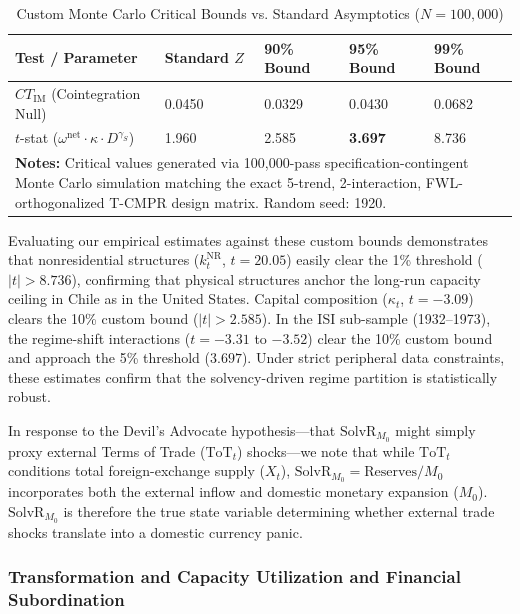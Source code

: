\begin{table}[h!]
	\centering
	\caption{Custom Monte Carlo Critical Bounds vs. Standard Asymptotics ($N = 100,000$)}
	\label{tab:chile_mc_bounds}
	\begin{tabular}{p{4.5cm} p{2.2cm} p{2.2cm} p{2.2cm} p{2.2cm}}
		\toprule
		\textbf{Test / Parameter} & \textbf{Standard $Z$} & \textbf{90\% Bound} & \textbf{95\% Bound} & \textbf{99\% Bound} \\
		\midrule
		$CT_{\text{IM}}$ (Cointegration Null) & 0.0450 & 0.0329 & 0.0430 & 0.0682 \\
		$t$-stat ($\omega^{\text{net}} \cdot \kappa \cdot D^{\gamma_S}$) & 1.960 & 2.585 & \textbf{3.697} & 8.736 \\
		\bottomrule
		\multicolumn{5}{p{13.3cm}}{\footnotesize \textbf{Notes:} Critical values generated via 100,000-pass specification-contingent Monte Carlo simulation matching the exact 5-trend, 2-interaction, FWL-orthogonalized T-CMPR design matrix. Random seed: 1920.}
	\end{tabular}
\end{table}

Evaluating our empirical estimates against these custom bounds demonstrates that nonresidential structures ($k^{\text{NR}}_t$, $t = 20.05$) easily clear the 1\% threshold ($|t| > 8.736$), confirming that physical structures anchor the long-run capacity ceiling in Chile as in the United States. Capital composition ($\kappa_t$, $t = -3.09$) clears the 10\% custom bound ($|t| > 2.585$). In the ISI sub-sample (1932--1973), the regime-shift interactions ($t = -3.31$ to $-3.52$) clear the 10\% custom bound and approach the 5\% threshold ($3.697$). Under strict peripheral data constraints, these estimates confirm that the solvency-driven regime partition is statistically robust.

In response to the Devil's Advocate hypothesis---that $\text{SolvR}_{M_0}$ might simply proxy external Terms of Trade ($\text{ToT}_t$) shocks---we note that while $\text{ToT}_t$ conditions total foreign-exchange supply ($X_t$), $\text{SolvR}_{M_0} = \text{Reserves}/M_0$ incorporates both the external inflow and domestic monetary expansion ($M_0$). $\text{SolvR}_{M_0}$ is therefore the true state variable determining whether external trade shocks translate into a domestic currency panic.

\subsubsection{Transformation and Capacity Utilization and Financial Subordination}
\label{sec:443:chile_utilization}

